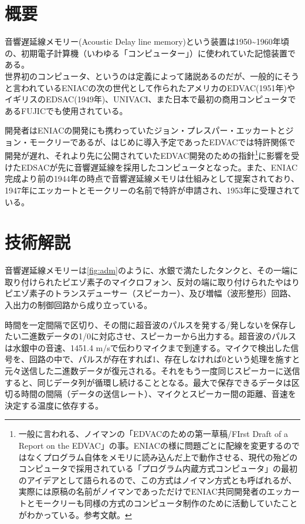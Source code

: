 \documentclass[a4paper,report]{jsbook}
\begin{document}
\section{概要}\label{ux6982ux8981}

音響遅延線メモリー(Acoustic Delay line
memory)という装置は1950\textasciitilde{}1960年頃の、初期電子計算機（いわゆる「コンピューター」）に使われていた記憶装置である。\\
世界初のコンピュータ、というのは定義によって諸説あるのだが、一般的にそうと言われているENIACの次の世代として作られたアメリカのEDVAC(1951年)やイギリスのEDSAC(1949年)、UNIVACⅠ、また日本で最初の商用コンピュータであるFUJICでも使用されている\autocite{ipsjmusium}。

開発者はENIACの開発にも携わっていたジョン・プレスパー・エッカートとジョン・モークリーであるが、はじめに導入予定であったEDVACでは特許関係で開発が遅れ、それより先に公開されていたEDVAC開発のための指針\footnote{一般に言われる、ノイマンの「EDVACのための第一草稿/FIrst
  Draft of a Report on the
  EDVAC」の事。ENIACの様に問題ごとに配線を変更するのではなくプログラム自体をメモリに読み込んだ上で動作させる、現代の殆どのコンピュータで採用されている「プログラム内蔵方式コンピュータ」の最初のアイデアとして語られるので、この方式はノイマン方式とも呼ばれるが、実際には原稿の名前がノイマンであっただけでENIAC共同開発者のエッカートとモークリーも同様の方式のコンピュータ制作のために活動していたことがわかっている。参考文献\autocite{von1993first}。}に影響を受けたEDSACが先に音響遅延線を採用したコンピュータとなった。また、ENIAC完成より前の1944年の時点で音響遅延線メモリは仕組みとして提案されており、1947年にエッカートとモークリーの名前で特許が申請され、1953年に受理されている\autocite{eckert1953memory}。

\section{技術解説}\label{ux6280ux8853ux89e3ux8aac}

音響遅延線メモリーは\cref{fig:adm}のように、水銀で満たしたタンクと、その一端に取り付けられたピエゾ素子のマイクロフォン、反対の端に取り付けられたやはりピエゾ素子のトランスデューサー（スピーカー）、及び増幅（波形整形）回路、入出力の制御回路から成り立っている。

時間を一定間隔で区切り、その間に超音波のパルスを発する/発しないを保存したい二進数データの1/0に対応させ、スピーカーから出力する。超音波のパルスは水銀中の音速、1451.4
m/sで伝わりマイクまで到達する。マイクで検出した信号を、回路の中で、パルスが存在すれば1、存在しなければ0という処理を施すと元々送信した二進数データが復元される。それをもう一度同じスピーカーに送信すると、同じデータ列が循環し続けることとなる。最大で保存できるデータは区切る時間の間隔（データの送信レート）、マイクとスピーカー間の距離、音速を決定する温度に依存する。
\end{document}
